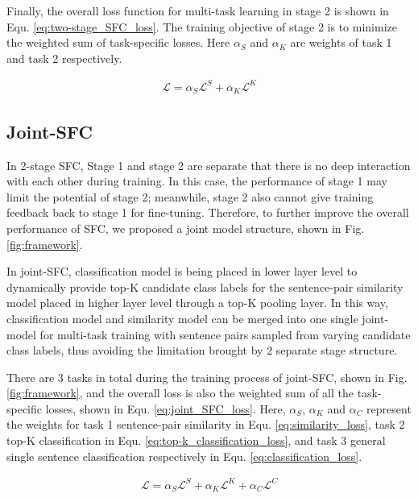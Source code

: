 Finally,  the  overall  loss  function for multi-task learning in stage 2 is
shown in Equ. \ref{eq:two-stage_SFC_loss}. The training objective of stage 2 is
to  minimize  the  weighted  sum  of task-specific losses. Here $\alpha_S$ and
$\alpha_K$  are  weights  of  task  1  and  task  2  respectively.

\begin{align}
  \mathcal{L} = \alpha_S \mathcal{L}^S + \alpha_K \mathcal{L}^K
  \label{eq:two-stage_SFC_loss}
\end{align}
\vspace{-2em}


\subsection{Joint-SFC}
In  2-stage  SFC,  Stage  1  and  stage 2 are separate that there is no deep
interaction  with each other during training. In this case, the performance of
stage  1  may  limit  the potential of stage 2; meanwhile, stage 2 also cannot
give  training feedback back to stage 1 for fine-tuning. Therefore, to further
improve  the  overall performance of SFC, we proposed a joint model structure,
shown in Fig. \ref{fig:framework}.

In  joint-SFC,  classification  model is being placed in lower layer level to
dynamically  provide  top-K  candidate  class  labels  for  the  sentence-pair
similarity  model  placed in higher layer level through a top-K pooling layer.
In  this way, classification model and similarity model can be merged into one
single  joint-model  for  multi-task training with sentence pairs sampled from
varying  candidate  class  labels,  thus  avoiding the limitation brought by 2
separate stage structure.

There  are 3 tasks in total during the training process of joint-SFC, shown in
Fig. \ref{fig:framework}, and the overall loss is also the weighted sum of all
the   task-specific  losses,  shown  in  Equ.  \ref{eq:joint_SFC_loss}.  Here,
$\alpha_S$,  $\alpha_K$  and  $\alpha_C$  represent  the  weights  for  task 1
sentence-pair  similarity  in  Equ.  \ref{eq:similarity_loss},  task  2  top-K
classification  in Equ. \ref{eq:top-k_classification_loss}, and task 3 general
single       sentence       classification      respectively      in      Equ.
\ref{eq:classification_loss}.

\vspace{-1.5em}
\begin{align}
  \mathcal{L} = \alpha_S \mathcal{L}^S + \alpha_K \mathcal{L}^K + \alpha_C \mathcal{L}^C
  \label{eq:joint_SFC_loss}
\end{align}
\vspace{-1.5em}
